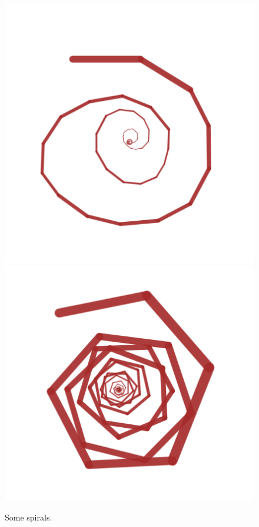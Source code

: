 			\begin{figure}[H]
				\centering
				\caption{\label{ran_spir_02} Some spirals.}
				\includegraphics[width=0.29\TW]{img/Randomness/Node/ran_spir_02.png}
				\includegraphics[width=0.29\TW]{img/Randomness/Node/ran_spir_03.png}

\end{figure}
